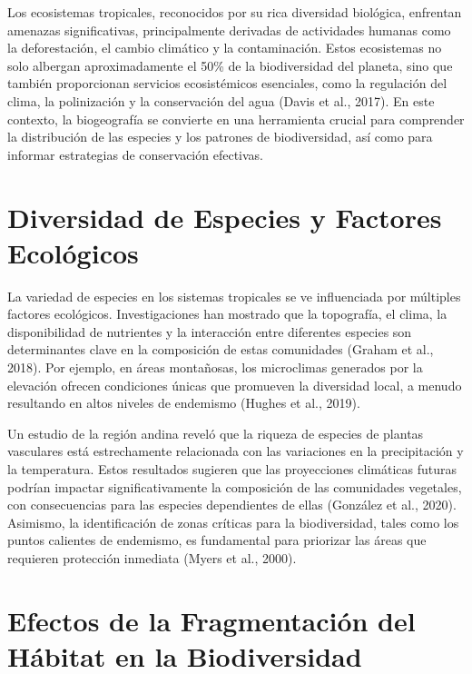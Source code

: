 \documentclass[
  letterpaper,
  DIV=11,
  numbers=noendperiod,
  oneside]{scrreprt}
\begin{document}
Los ecosistemas tropicales, reconocidos por su rica diversidad
biológica, enfrentan amenazas significativas, principalmente derivadas
de actividades humanas como la deforestación, el cambio climático y la
contaminación. Estos ecosistemas no solo albergan aproximadamente el
50\% de la biodiversidad del planeta, sino que también proporcionan
servicios ecosistémicos esenciales, como la regulación del clima, la
polinización y la conservación del agua (Davis et al., 2017). En este
contexto, la biogeografía se convierte en una herramienta crucial para
comprender la distribución de las especies y los patrones de
biodiversidad, así como para informar estrategias de conservación
efectivas.

\section{Diversidad de Especies y Factores
Ecológicos}\label{diversidad-de-especies-y-factores-ecoluxf3gicos}

La variedad de especies en los sistemas tropicales se ve influenciada
por múltiples factores ecológicos. Investigaciones han mostrado que la
topografía, el clima, la disponibilidad de nutrientes y la interacción
entre diferentes especies son determinantes clave en la composición de
estas comunidades (Graham et al., 2018). Por ejemplo, en áreas
montañosas, los microclimas generados por la elevación ofrecen
condiciones únicas que promueven la diversidad local, a menudo
resultando en altos niveles de endemismo (Hughes et al., 2019).

Un estudio de la región andina reveló que la riqueza de especies de
plantas vasculares está estrechamente relacionada con las variaciones en
la precipitación y la temperatura. Estos resultados sugieren que las
proyecciones climáticas futuras podrían impactar significativamente la
composición de las comunidades vegetales, con consecuencias para las
especies dependientes de ellas (González et al., 2020). Asimismo, la
identificación de zonas críticas para la biodiversidad, tales como los
puntos calientes de endemismo, es fundamental para priorizar las áreas
que requieren protección inmediata (Myers et al., 2000).

\section{Efectos de la Fragmentación del Hábitat en la
Biodiversidad}\label{efectos-de-la-fragmentaciuxf3n-del-huxe1bitat-en-la-biodiversidad}
\end{document}
